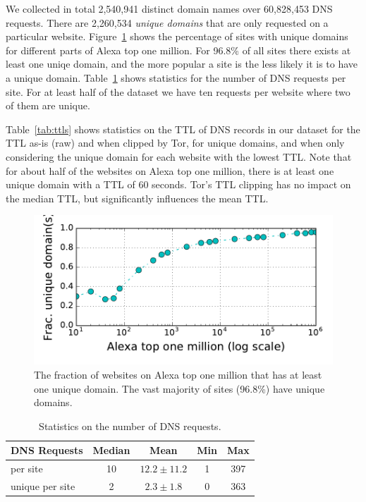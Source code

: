 We collected in total 2,540,941 distinct domain names over 60,828,453 DNS
requests. There are 2,260,534 \emph {unique domains} that are only requested on
a particular website. Figure~\ref{fig:unique-domains} shows the percentage of
sites with unique domains for different parts of Alexa top one million.
For 96.8\% of all sites there exists at least one uniqe domain, and the more
popular a site is the less likely it is to have a unique domain.
Table~\ref{tab:dns-requests} shows statistics for the number of DNS requests per
site. For at least half of the dataset we have ten requests per website where
two of them are unique.

Table~\ref{tab:ttls} shows statistics on the TTL of DNS records in our dataset
for the TTL as-is (raw) and when clipped by Tor, for unique domains, and when
only considering the unique domain for each website with the lowest TTL.
Note that for about half of the websites on Alexa top one million, there is at
least one unique domain with a TTL of 60 seconds. Tor's TTL clipping has no
impact on the median TTL, but significantly influences the mean TTL.

\begin{figure}[t]
	\centering
	\includegraphics[width=0.7\linewidth]{figures/dns-unique-domains.pdf}
	\caption{The fraction of websites on Alexa top one million that has at least
	one unique domain. The vast majority of sites (96.8\%) have unique domains.}
	\label{fig:unique-domains}
\end{figure}

\begin{table}[t]
	\centering
	\caption{Statistics on the number of DNS requests.}
	\begin{tabular}{l c c c c}
	\toprule
	\textbf{DNS Requests} & \textbf{Median} & \textbf{Mean} & \textbf{Min} & \textbf{Max} \\
	\midrule
	per site & 10 & $12.2\pm11.2$ & 1 & 397 \\
	unique per site & 2 & $2.3\pm1.8$ & 0 & 363 \\
	\bottomrule
	\end{tabular}
	\label{tab:dns-requests}
\end{table}

